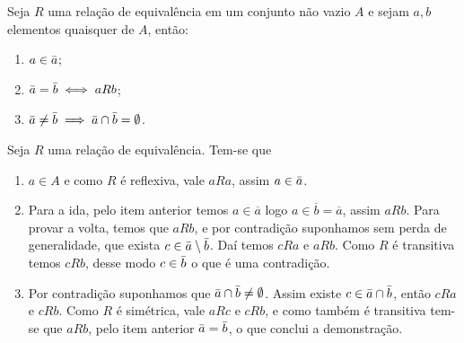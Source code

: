 \documentclass[../main.tex]{subfiles}
\begin{document}


\begin{teo}\label{agb-teo-relacaoEquivalenciaPropriedades}
    Seja $R$ uma relação de equivalência em um conjunto não vazio $A$ e sejam $a,b$ elementos quaisquer de $A$, então:
    \begin{enumerate}[label=(\roman*)]
        \item $a \in \Bar{a}$;
        \item $\Bar{a} = \Bar{b} \iff aRb$;
        \item $\Bar{a} \neq \Bar{b} \implies \Bar{a} \cap \Bar{b} = \emptyset $.
    \end{enumerate}
\end{teo}

\begin{dem}
    Seja $R$ uma relação de equivalência. Tem-se que
    \begin{enumerate}[label=(\roman*)]
        \item $a \in A$ e como $R$ é reflexiva, vale $aRa$, assim $a \in \Bar{a}$.
        \item Para a ida, pelo item anterior temos $a \in \overline{a}$ logo $a \in \overline{b} = \overline{a}$, assim $aRb$. Para provar a volta, temos que $aRb$, e por contradição suponhamos sem perda de generalidade, que exista $c \in \Bar{a} \setminus \Bar{b}$. Daí temos $cRa$ e $aRb$. Como $R$ é transitiva temos $cRb$, desse modo $c \in \Bar{b}$ o que é uma contradição.
        \item Por contradição suponhamos que $\Bar{a} \cap \Bar{b} \neq \emptyset$. Assim existe $c \in \Bar{a} \cap \Bar{b}$, então $cRa$ e $cRb$. Como  $R$ é simétrica, vale $aRc$ e $cRb$, e como também é transitiva tem-se que $aRb$, pelo item anterior $\Bar{a} = \Bar{b}$, o que conclui a demonstração.
    \end{enumerate}
\end{dem}
\end{document}
